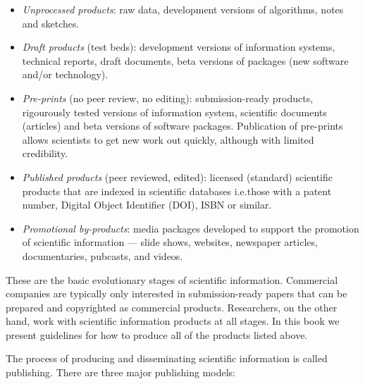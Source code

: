 \documentclass[graybox,envcountchap,sectrefs,UStrade]{svmono}
\begin{document}
\begin{itemize}
  \item \emph{Unprocessed products}: raw data, development versions of algorithms, notes and sketches.
  \item \emph{Draft products} (test beds): development versions of information systems, technical reports, draft documents, beta versions of packages (new software and/or technology).
  \item \emph{Pre-prints} (no peer review, no editing): submission-ready products, rigourously tested versions of information system, scientific documents (articles) and beta versions of software packages. Publication of pre-prints allows scientists to get new work out quickly, although with limited credibility.
  \item \emph{Published products} (peer reviewed, edited): licensed (standard) scientific products that are indexed in scientific databases i.e.\@ those with a patent number, Digital Object Identifier (DOI), ISBN or similar.
  \item \emph{Promotional by-products}: media packages developed to support the promotion of scientific information --- slide shows, websites, newspaper articles, documentaries, pubcasts, and videos.
\end{itemize}

These are the basic evolutionary stages of scientific information. Commercial companies are typically only interested in submission-ready papers that can be prepared and copyrighted as commercial products. Researchers, on the other hand, work with scientific information products at all stages. In this book we present guidelines for how to produce all of the products listed above. \par

The process of producing and disseminating scientific information is called publishing. There are three major publishing models:
\end{document}
